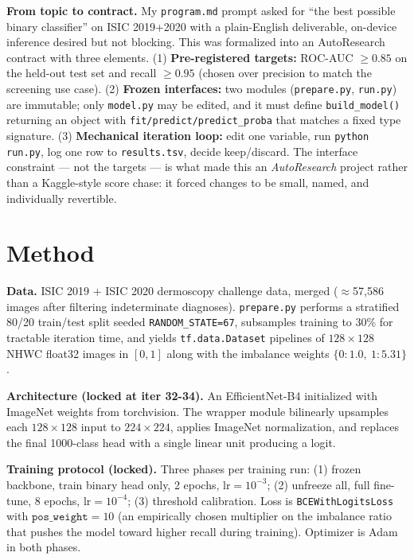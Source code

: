\documentclass{article}
\begin{document}
\textbf{From topic to contract.} My \texttt{program.md} prompt asked for
``the best possible binary classifier'' on ISIC 2019+2020 with a
plain-English deliverable, on-device inference desired but not blocking.
This was formalized into an AutoResearch contract with three
elements. (1) \textbf{Pre-registered targets:} ROC-AUC $\ge 0.85$ on
the held-out test set and recall $\ge 0.95$ (chosen over precision to
match the screening use case). (2) \textbf{Frozen interfaces:} two
modules (\texttt{prepare.py}, \texttt{run.py}) are immutable; only
\texttt{model.py} may be edited, and it must define \texttt{build\_model()}
returning an object with \texttt{fit/predict/predict\_proba} that matches
a fixed type signature. (3) \textbf{Mechanical iteration loop:} edit one
variable, run \texttt{python run.py}, log one row to \texttt{results.tsv},
decide keep/discard. The interface constraint --- not the targets ---
is what made this an \emph{AutoResearch} project rather than a Kaggle-style
score chase: it forced changes to be small, named, and individually
revertible.

\section{Method}

\textbf{Data.} ISIC 2019 + ISIC 2020 dermoscopy challenge data, merged
($\approx$57{,}586 images after filtering indeterminate diagnoses).
\texttt{prepare.py} performs a stratified 80/20 train/test split seeded
\texttt{RANDOM\_STATE=67}, subsamples training to 30\% for tractable
iteration time, and yields \texttt{tf.data.Dataset} pipelines of
$128\times128$ NHWC float32 images in $[0,1]$ along with the imbalance
weights $\{0\!:\!1.0,~1\!:\!5.31\}$.

\textbf{Architecture (locked at iter 32-34).} An EfficientNet-B4
\citep{tan2019efficientnet} initialized with ImageNet weights from
torchvision. The wrapper module bilinearly upsamples each $128\times128$
input to $224\times224$, applies ImageNet normalization, and replaces
the final 1000-class head with a single linear unit producing a logit.

\textbf{Training protocol (locked).} Three phases per training run:
(1) frozen backbone, train binary head only, 2 epochs, $\text{lr}=10^{-3}$;
(2) unfreeze all, full fine-tune, 8 epochs, $\text{lr}=10^{-4}$;
(3) threshold calibration. Loss is \texttt{BCEWithLogitsLoss} with
$\texttt{pos\_weight}=10$ (an empirically chosen multiplier on the
imbalance ratio that pushes the model toward higher recall during
training). Optimizer is Adam in both phases.
\end{document}
